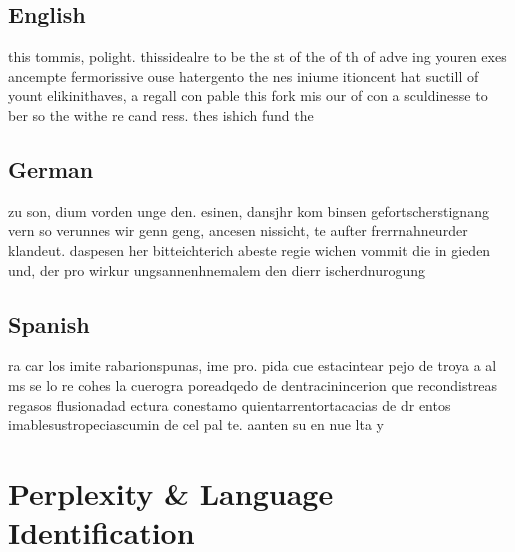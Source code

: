 \documentclass{article}
\begin{document}
\subsection{English}
this tommis, polight.
thissidealre to be the st of the of th of adve ing youren exes ancempte fermorissive ouse hatergento the nes iniume itioncent hat suctill of yount elikinithaves, a regall con pable this fork mis our of con a sculdinesse to ber so the withe re cand ress.
thes ishich fund the

\subsection{German}
zu son, dium vorden unge den.
esinen, dansjhr kom binsen gefortscherstignang vern so verunnes wir genn geng, ancesen nissicht, te aufter frerrnahneurder klandeut.
daspesen her bitteichterich abeste regie wichen vommit die in gieden und, der pro wirkur ungsannenhnemalem den dierr ischerdnurogung 

\subsection{Spanish}
ra car los imite rabarionspunas, ime pro.
pida cue estacintear pejo de troya a al ms se lo re cohes la cuerogra poreadqedo de dentracinincerion que recondistreas regasos flusionadad ectura conestamo quientarrentortacacias de dr entos imablesustropeciascumin de cel pal te.
aanten su en nue lta y 

\section{Perplexity \& Language Identification}







\end{document}
